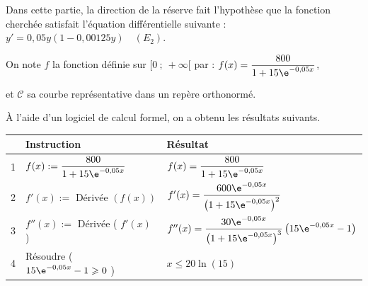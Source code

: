 	Dans cette partie, la direction de la réserve fait l'hypothèse que la fonction cherchée satisfait l'équation différentielle suivante :
$y'=0,05 y \left (1-0,00125 y\right ) \quad (E_2)$.

On note $f$ la fonction définie sur $[0 ~;~ +\infty[$ par :
$f(x)=\dfrac{800}{1+15 \e^{-0,05 x}}$,

	et $\mathcal{C}$ sa courbe représentative dans un repère orthonormé.

	\medskip

	À l'aide d'un logiciel de calcul formel, on a obtenu les résultats suivants.


	\begin{center}
\renewcommand{\arraystretch}{1.5}
\begin{tabularx}{\linewidth}{|l|l|>{\centering \arraybackslash}X|} 
\hline
  & Instruction & Résultat \\	
\hline
1 & $f(x):=\dfrac{800}{1+15 \e^{-0,05 x}}$	& $f(x)=\dfrac{800}{1+15 \e^{-0,05 x}}$  \rule[-13pt]{0pt}{30pt}\\	
\hline
2 & $f'(x):=$ Dérivée $(f(x))$ & $f'(x)=\dfrac{600 \e^{-0,05 x}}{\left(1+15 \e^{-0,05 x}\right)^{2}}$ \rule[-15pt]{0pt}{35pt} \\ 
\hline
3 & $f''(x):=$ Dérivée ( $f'(x)$ ) & $f''(x)=\dfrac{30 \e^{-0,05 x}}{\left(1+15 \e^{-0,05 x}\right)^{3}}\left(15 \e^{-0,05 x}-1\right)$ \rule[-15pt]{0pt}{35pt} \\ 
\hline
4 & Résoudre ( $15 \e^{-0,05 x}-1 \geqslant 0$ )  & $x \leqslant 20 \ln (15)$  \\		
\hline
\end{tabularx}
\renewcommand{\arraystretch}{1}
	\end{center}

